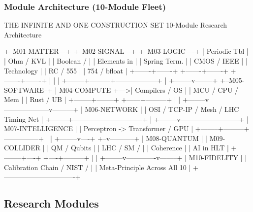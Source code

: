 \documentclass[11pt,letterpaper]{article}
\begin{document}
\subsubsection{Module Architecture (10-Module Fleet)}

\begin{asciibox}
              THE INFINITE AND ONE CONSTRUCTION SET
                  10-Module Research Architecture

+--M01-MATTER---+  +--M02-SIGNAL---+  +--M03-LOGIC----+
| Periodic Tbl  |  | Ohm / KVL     |  | Boolean /     |
| Elements in   |  | Spring Term.  |  | CMOS / IEEE   |
| Technology    |  | RC / 555      |  | 754 / bfloat  |
+-------+-------+  +-------+-------+  +-------+-------+
        |                  |                  |
        +--------+---------+------------------+
                 |
        +--------v--------+    +--M05-SOFTWARE--+
        |  M04-COMPUTE    +--->| Compilers / OS |
        | MCU / CPU / Mem |    | Rust / UB      |
        +--------+--------+    +------+---------+
                 |                    |
        +--------v--------------------v---------+
        |            M06-NETWORK                |
        | OSI / TCP-IP / Mesh / LHC Timing Net  |
        +--------+------------------------------+
                 |
        +--------v--------------------------+
        |        M07-INTELLIGENCE           |
        | Perceptron -> Transformer / GPU   |
        +--------+---------+---------------+
                 |          |
        +--------v----+  +--v-----------+
        | M08-QUANTUM |  | M09-COLLIDER |
        | QM / Qubits |  | LHC / SM /   |
        | Coherence   |  | AI in HLT    |
        +--------+----+  +----+---------+
                 |             |
        +--------v-------------v--------+
        |         M10-FIDELITY          |
        | Calibration Chain / NIST /    |
        | Meta-Principle Across All 10  |
        +-------------------------------+
\end{asciibox}

\subsection{Research Modules}
\end{document}
